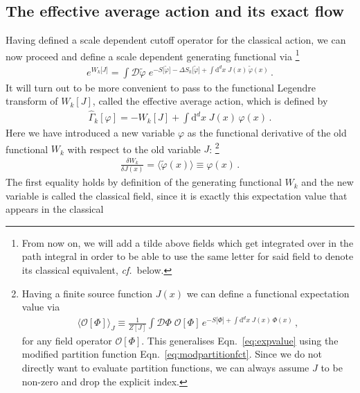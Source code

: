 \documentclass[11pt]{book}
\newcommand\cf{\textit{cf.}\ }
\numberwithin{equation}{chapter}
\begin{document}
\subsection{The effective average action and its exact flow}
\label{sec:floweqn}

Having defined a scale dependent cutoff operator for the
classical action, we can now proceed and define a scale
dependent generating functional via%
\footnote{%
  From now on,
  we will add a tilde above fields which get integrated over in the
  path integral in order to be able to use the same letter for said
  field to denote its classical equivalent, \cf below.
}
\begin{align}
  e^{ W_k \lbrack J \rbrack }
  = \int \mathcal D \tilde \varphi \;
  e^{
    - S \lbrack \tilde \varphi \rbrack
    - \Delta S_k \lbrack \tilde \varphi \rbrack
    + \int \mathrm d^dx \; J(x) \, \tilde \varphi(x)
  } \,.
\end{align}
It will turn out to be more convenient to pass to the
functional Legendre transform of $W_k[J]$,
called the effective average action, which is defined by
\begin{align}
  \hat \Gamma_k [\varphi] = - W_k[J] + \int \mathrm d^dx \; J(x) \, \varphi(x) \,.
\end{align}
Here we have introduced a new variable $\varphi$ as
the functional derivative of the old functional $W_k$ with
respect to the old variable $J$:%
\footnote{%
  Having a finite source function $J(x)$ we can define a
  functional expectation value via
  \begin{align*}
    \big\langle  \mathcal O[\Phi] \big\rangle_J
    \equiv \frac{1}{Z[J]} \int \mathcal D \Phi \;
    \mathcal O[\Phi] \,
    e^{
      - S \lbrack \Phi \rbrack
      + \int \mathrm d^dx \; J(x) \, \Phi(x)
    } \,,
    \label{eq:expvalueJ}
  \end{align*}
  for any field operator $\mathcal O[\Phi]$. This generalises
  Eqn.~\eqref{eq:expvalue} using the modified partition
  function Eqn.~\eqref{eq:modpartitionfct}. Since we do not
  directly want to evaluate partition functions,
  we can always assume $J$ to be non-zero and drop the explicit index.
}
\begin{align}
  \frac{ \delta W_k }{ \delta J(x) }
  = \big\langle \tilde \varphi(x) \big\rangle
  \equiv \varphi (x) \,.
\end{align}
The first equality holds by definition of the generating functional
$W_k$ and the new variable is called the classical field, since
it is exactly this expectation value that appears in the classical
\end{document}
